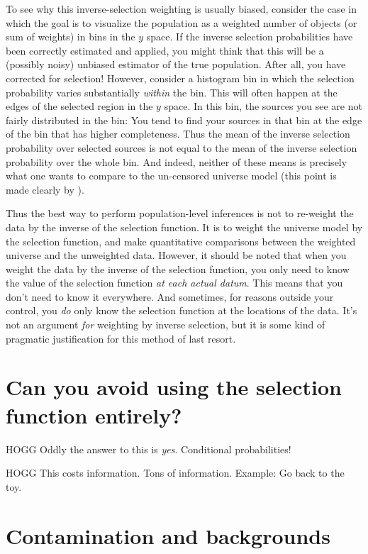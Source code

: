 \documentclass[modern]{aastex62}
\begin{document}
To see why this inverse-selection weighting is usually biased,
consider the case in which the goal is to visualize the population as
a weighted number of objects (or sum of weights) in bins in the $y$
space.
If the inverse selection probabilities have been correctly estimated
and applied, you might think that this will be a (possibly noisy)
unbiased estimator of the true population.
After all, you have corrected for selection!
However, consider a histogram bin in which the selection probability
varies substantially \emph{within} the bin.
This will often happen at the edges of the selected region in the $y$
space.
In this bin, the sources you see are not fairly distributed in the
bin: You tend to find your sources in that bin at the edge of the bin
that has higher completeness.
Thus the mean of the inverse selection probability over selected
sources is not equal to the mean of the inverse selection probability
over the whole bin.
And indeed, neither of these means is precisely what one wants to
compare to the un-censored universe model (this point is made clearly
by \citealt{blogpost}).

Thus the best way to perform population-level inferences is not to
re-weight the data by the inverse of the selection function.  It is to
weight the universe model by the selection function, and make
quantitative comparisons between the weighted universe and the
unweighted data.
However, it should be noted that when you weight the data by the
inverse of the selection function, you only need to know the value of
the selection function \emph{at each actual datum}.
This means that you don't need to know it everywhere.
And sometimes, for reasons outside your control, you \emph{do} only
know the selection function at the locations of the data.
It's not an argument \emph{for} weighting by inverse selection, but it
is some kind of pragmatic justification for this method of last
resort.

\section{Can you avoid using the selection function entirely?}\label{sec:avoid}

HOGG Oddly the answer to this is \emph{yes}. Conditional probabilities!

HOGG This costs information. Tons of information. Example: Go back to the toy.

\section{Contamination and backgrounds}\label{sec:bg}
\end{document}
